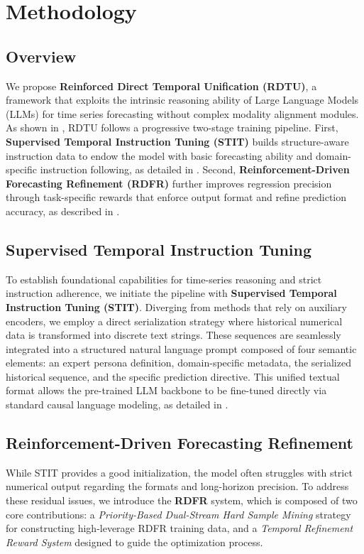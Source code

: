 \section{Methodology}

\subsection{Overview}
We propose \textbf{Reinforced Direct Temporal Unification (RDTU)}, a framework that exploits the intrinsic reasoning ability of Large Language Models (LLMs) for time series forecasting without complex modality alignment modules. As shown in , RDTU follows a progressive two-stage training pipeline. First, \textbf{Supervised Temporal Instruction Tuning (STIT)} builds structure-aware instruction data to endow the model with basic forecasting ability and domain-specific instruction following, as detailed in . Second, \textbf{Reinforcement-Driven Forecasting Refinement (RDFR)} further improves regression precision through task-specific rewards that enforce output format and refine prediction accuracy, as described in .

\subsection{Supervised Temporal Instruction Tuning}\label{sec:stit}

To establish foundational capabilities for time-series reasoning and strict instruction adherence, we initiate the pipeline with \textbf{Supervised Temporal Instruction Tuning (STIT)}. Diverging from methods that rely on auxiliary encoders, we employ a direct serialization strategy where historical numerical data is transformed into discrete text strings. These sequences are seamlessly integrated into a structured natural language prompt composed of four semantic elements: an expert persona definition, domain-specific metadata, the serialized historical sequence, and the specific prediction directive. This unified textual format allows the pre-trained LLM backbone to be fine-tuned directly via standard causal language modeling, as detailed in .



\subsection{Reinforcement-Driven Forecasting Refinement}\label{sec:rdfr}
While STIT provides a good initialization, the model often struggles with strict numerical output regarding the formats and long-horizon precision. To address these residual issues, we introduce the \textbf{RDFR} system, which is composed of two core contributions: a \textit{Priority-Based Dual-Stream Hard Sample Mining} strategy for constructing high-leverage RDFR training data, and a \textit{Temporal Refinement Reward System} designed to guide the optimization process.

